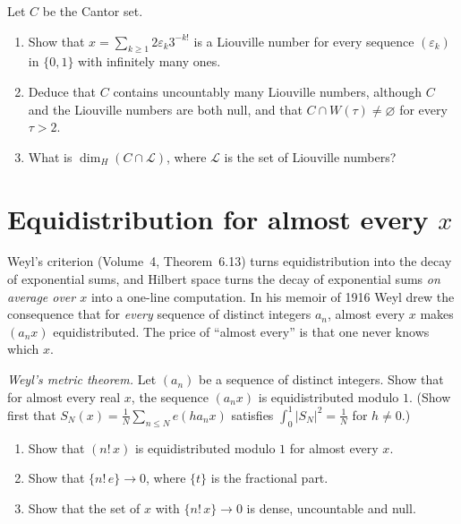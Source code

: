\begin{exercise}[$\star$]\label{pb:cantorL}
Let $C$ be the Cantor set.
\begin{enumerate}[label=(\alph*)]
\item Show that $x=\sum_{k\ge1}2\varepsilon_k3^{-k!}$ is a Liouville number for every sequence $(\varepsilon_k)$ in $\{0,1\}$ with infinitely many ones.
\item Deduce that $C$ contains uncountably many Liouville numbers, although $C$ and the Liouville numbers are both null, and that
$C\cap W(\tau)\ne\varnothing$ for every $\tau>2$.
\item What is $\dim_H(C\cap\mathcal L)$, where $\mathcal L$ is the set of Liouville numbers?
\end{enumerate}
\end{exercise}

\section{Equidistribution for almost every \texorpdfstring{$x$}{x}}

Weyl's criterion (Volume~4, Theorem~6.13) turns equidistribution into the decay of exponential sums, and Hilbert space turns the decay of exponential
sums \emph{on average over $x$} into a one-line computation. In his memoir of 1916 Weyl drew the consequence that for \emph{every} sequence of
distinct integers $a_n$, almost every $x$ makes $(a_nx)$ equidistributed. The price of ``almost every'' is that one never knows which $x$.

\begin{exercise}[$\star\star$]\label{pb:weylae}
\emph{Weyl's metric theorem.} Let $(a_n)$ be a sequence of distinct integers. Show that for almost every real $x$, the sequence $(a_nx)$ is equidistributed
modulo $1$. (Show first that $S_N(x)=\frac1N\sum_{n\le N}e(ha_nx)$ satisfies $\int_0^1|S_N|^2=\frac1N$ for $h\ne0$.)
\end{exercise}

\begin{exercise}[$\star$]\label{pb:factorial}
\begin{enumerate}[label=(\alph*)]
\item Show that $(n!\,x)$ is equidistributed modulo $1$ for almost every $x$.
\item Show that $\{n!\,e\}\to0$, where $\{t\}$ is the fractional part.
\item Show that the set of $x$ with $\{n!\,x\}\to0$ is dense, uncountable and null.
\end{enumerate}
\end{exercise}

